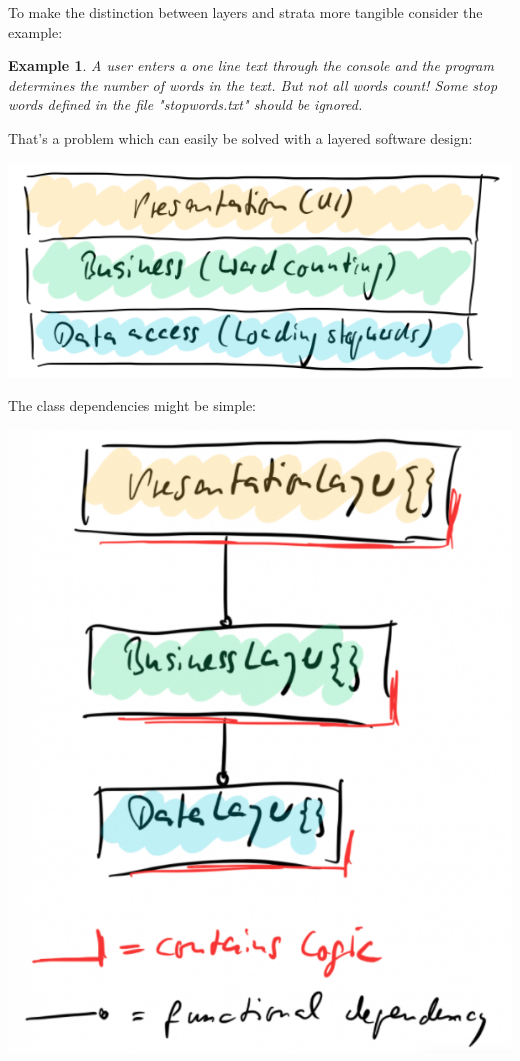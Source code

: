 \documentclass[a4paper,twoside]{article}
\newtheorem{example}[theorem]{Example}
\numberwithin{equation}{section}
\begin{document}
To make the distinction between layers and strata more tangible consider the example:
\begin{example}
    A user enters a one line text through the console and the program determines \newline
    the number of words in the text. But not all words count! Some stop words defined in the file \textit{"stopwords.txt"} should be ignored.
\end{example}
That's a problem which can easily be solved with a layered software design:
\begin{center}
    \includegraphics[scale = 0.3]{assets/example_layered.png}
\end{center}
The class dependencies might be simple:
\begin{center}
    \includegraphics[scale = 0.3]{assets/tree_class.png}
\end{center}
\end{document}

